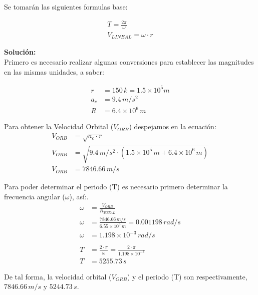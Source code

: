 \documentclass[11pt,letterpaper]{article}
\begin{document}
Se tomarán las siguientes formulas base:

\begin{align}
\boxed{ T = \frac{2\pi}{\omega}}\\
\boxed{ V_{LINEAL} = \omega \cdot r}
\end{align}

\textbf{Solución:}\\

Primero es necesario realizar algunas conversiones para establecer las magnitudes en las mismas unidades, a saber:

\begin{align}
r &= 150\,k = 1.5 \times 10^5 m\\
a_{c} &= 9.4\,m/s^2\\
R &= 6.4 \times 10^6\,m
\end{align}

Para obtener la Velocidad Orbital ($V_{ORB}$) despejamos en la ecuación:\\

\begin{align*}
V_{ORB} &= \sqrt{a_{c} \cdot r}\\
V_{ORB} &= \sqrt{9.4\,m/s^2 \cdot (1.5 \times 10^5\,m + 6.4 \times 10^6\,m)}\\
V_{ORB} &= 7846.66\,m/s
\end{align*}

Para poder determinar el periodo (T) es necesario primero determinar la frecuencia angular ($\omega$), así:.\\

\begin{align*}
\omega &= \frac{V_{ORB}}{R_{TOTAL}}\\
\omega &=\frac{7846.66\,m/s}{6.55 \times 10^6\,m} = 0.001198\,rad/s\\
\omega &=1.198 \times 10^{-3}\,rad/s
\,\\ \,\\
T &= \frac{2\cdot\pi}{\omega} = \frac{2\cdot\pi}{1.198 \times 10^{-3}}\\
T &= 5255.73\,s 
\end{align*}

De tal forma, la velocidad orbital ($V_{ORB}$) y el periodo (T) son respectivamente, $7846.66\,m/s$ y $5244.73\,s$.

\end{document}
